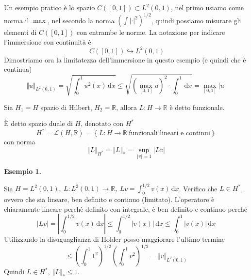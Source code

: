 \documentclass[10pt,a4paper,twoside,openright]{book}
\newcommand{\de}{\,\mathrm d}
\newcommand{\dx}{\de x}
\begin{document}
Un esempio pratico è lo spazio $\displaystyle C([ 0,1]) \subset L^{2}(0,1)$, nel primo usiamo come norma il $\max$, nel secondo la norma $\left(\int | \cdot | ^{2}\right)^{1/2}$, quindi possiamo misurare gli elementi di $\displaystyle C([ 0,1])$ con entrambe le norme. La notazione per indicare l'immersione con continuità è
\begin{equation*}
    \ C([ 0,1]) \hookrightarrow L^{2}(0,1)
\end{equation*}
Dimostriamo ora la limitatezza dell'immersione in questo esempio (e quindi che è continua)
\begin{equation*}
    \Vert u\Vert _{L^{2}(0,1)} =\sqrt{\int ^{1}_{0} u^{2}(x) \dx} \leqslant \sqrt{\left(\max_{[ 0,1]} u\right)^{2} \cdot \int ^{1}_{0} \dx} =\max_{[ 0,1]}| u|
\end{equation*}
\begin{definition}
    [Funzionale] Sia $\displaystyle H_{1} =H$ spazio di Hilbert, $\displaystyle H_{2} =\mathbb{R}$, allora $\displaystyle L:H\rightarrow \mathbb{R}$ è detto funzionale.
\end{definition}
\begin{definition}
     È detto spazio duale di $H$, denotato con $\displaystyle H^{*}$
    \begin{equation*}
        H^{*} =\mathcal{L}(H,\mathbb{R}) =\left\{L:H\rightarrow \mathbb{R} \ \text{funzionali lineari e continui}\right\}
    \end{equation*}
    con norma
    \begin{equation*}
        \Vert L\Vert _{H^{*}} =\Vert L\Vert _{*} =\sup _{\Vert v\Vert =1}| Lv|
    \end{equation*}
\end{definition}
\textbf{Esempio 1.}

Sia $\displaystyle H=L^{2}(0,1),\ L:L^{2}(0,1)\rightarrow \mathbb{R},\ Lv=\int ^{1/2}_{0} v(x) \dx$. Verifico che $\displaystyle L\in H^{*}$, ovvero che sia lineare, ben definito e continuo (limitato). L'operatore è chiaramente lineare perchè definito con integrale, è ben definito e continuo perché
\begin{equation*}
    | Lv| =\left| \int ^{1/2}_{0} v(x) \dx\right| \leqslant \int ^{1/2}_{0}| v(x)| \dx\leqslant \int ^{1}_{0}| v(x)| \dx
\end{equation*}
Utilizzando la disuguaglianza di Holder posso maggiorare l'ultimo termine
\begin{equation*}
    \leqslant \left(\int ^{1}_{0} 1^{2}\right)^{1/2}\left(\int ^{1}_{0} v^{2}\right)^{1/2} =\Vert v\Vert _{L^{2}(0,1)}
\end{equation*}
Quindi $\displaystyle L\in H^{*},\ \Vert L\Vert _{*} \leqslant 1$.
\end{document}
